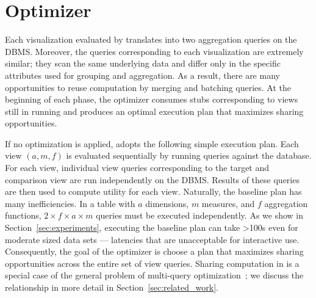 \section{\SeeDB Optimizer}
\label{sec:optimizer}

Each visualization evaluated by \SeeDB translates into two 
aggregation queries on the DBMS.
Moreover, the queries corresponding to each visualization are
extremely similar; they scan the same underlying data and  
differ only in the specific attributes used for grouping and aggregation.
As a result, there are many opportunities to reuse computation 
by merging and batching queries.
At the beginning of each phase, the \SeeDB optimizer consumes stubs
corresponding to views still in running and produces an optimal
execution plan that maximizes sharing opportunities.


 If no optimization is applied, \SeeDB adopts
the following simple execution plan.
Each view $(a, m, f)$ is evaluated sequentially by running queries against the database.
For each view, individual view queries corresponding to the
target and comparison view are run independently on the DBMS.
Results of these queries are then used to compute utility for each
view.
Naturally, the baseline plan has many inefficiencies.
In a table with $a$ dimensions, $m$ measures, and $f$ aggregation functions, 
$2\times f \times a \times  m$ queries must be executed independently.  
As we show in Section~\ref{sec:experiments}, executing the baseline plan can take >100s even for
moderate sized data sets --- latencies that are unacceptable for interactive use.
Consequently, the goal of the optimizer is choose a plan that
maximizes sharing opportunities across the entire set of view queries.
Sharing computation in \SeeDB is a special case of the general problem
of multi-query optimization~\cite{DBLP:journals/tods/Sellis88}; we discuss the 
relationship in more detail in Section~\ref{sec:related_work}.



